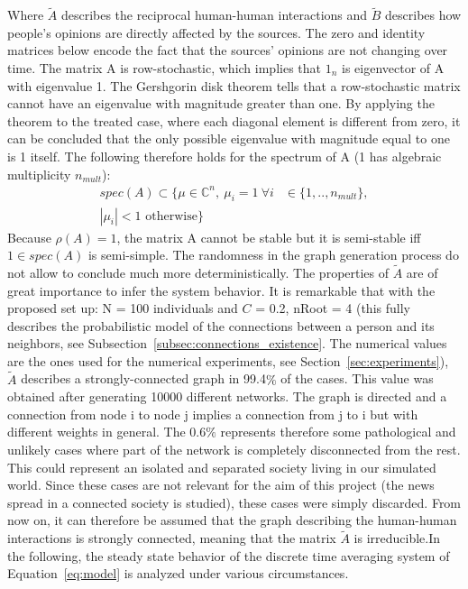 Where $\tilde{A}$ describes the reciprocal human-human interactions and $\tilde{B}$ describes how people's opinions are directly affected by the sources. The zero and identity matrices below encode the fact that the sources' opinions are not changing over time. \newline
The matrix A is row-stochastic, which implies that $1_n$ is eigenvector of A with eigenvalue 1. The Gershgorin disk theorem tells that a row-stochastic matrix cannot have an eigenvalue with magnitude greater than one. By applying the theorem to the treated case, where each diagonal element is different from zero, it can be concluded that the only possible eigenvalue with magnitude equal to one is 1 itself. The following therefore holds for the spectrum of A (1 has algebraic multiplicity $n_{mult}$):
\begin{align*}
spec(A) \subset \{\mu \in \mathbb{C}^n,\ \mu_i = 1\ \forall i & \in \{1,..,n_{mult}\},\\
| \mu_i | < 1 \text{ otherwise}\}
\end{align*}
Because $\rho(A) = 1$, the matrix A cannot be stable but it is semi-stable iff $1 \in spec(A)$ is semi-simple. \newline
The randomness in the graph generation process do not allow to conclude much more deterministically. The properties of $\tilde{A}$ are of great importance to infer the system behavior. It is remarkable that with the proposed set up: N = 100 individuals and $C$ = 0.2, nRoot = 4 (this fully describes the probabilistic model of the connections between a person and its neighbors, see Subsection~\ref{subsec:connections_existence}. The numerical values are the ones used for the numerical experiments, see Section~\ref{sec:experiments}), $\tilde{A}$ describes a strongly-connected graph in 99.4$\%$ of the cases. This value was obtained after generating 10000 different networks. The graph is directed and a connection from node i to node j implies a connection from j to i but with different weights in general. The 0.6$\%$ represents therefore some pathological and unlikely cases where part of the network is completely disconnected from the rest. This could represent an isolated and separated society living in our simulated world. Since these cases are not relevant for the aim of this project (the news spread in a connected society is studied), these cases were simply discarded. From now on, it can therefore be assumed that the graph describing the human-human interactions is strongly connected, meaning that the matrix $\tilde{A}$ is irreducible.\newline In the following, the steady state behavior of the discrete time averaging system of Equation~\eqref{eq:model}
is analyzed under various circumstances.
